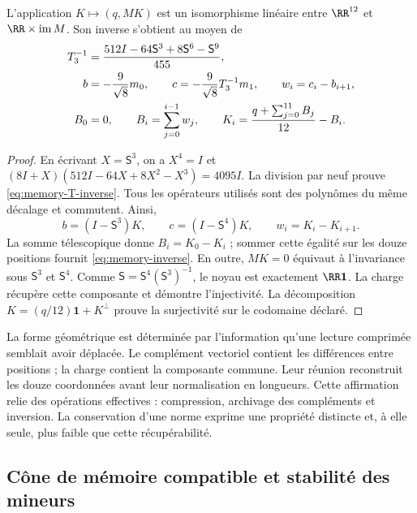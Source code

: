 \begin{theorem}
\label{thm:memory-inversion}
L'application \(K\mapsto(q,MK)\) est un isomorphisme linéaire entre \(\RR^{12}\) et \(\RR\times\operatorname{im}M\). Son inverse s'obtient au moyen de
\begin{align}
 T_3^{-1}&=\frac{512I-64\mathsf S^3+8\mathsf S^6-\mathsf S^9}{455},
 \label{eq:memory-T-inverse}\\
 b&=-\frac9{\sqrt8}m_0,\qquad
 c=-\frac9{\sqrt8}T_3^{-1}m_1,\qquad w_i=c_i-b_{i+1},\notag\\
 B_0&=0,\qquad B_i=\sum_{j=0}^{i-1}w_j,\qquad
 K_i=\frac{q+\sum_{j=0}^{11}B_j}{12}-B_i.
 \label{eq:memory-inverse}
\end{align}
\end{theorem}
\begin{proof}
En écrivant \(X=\mathsf S^3\), on a \(X^4=I\) et
\((8I+X)(512I-64X+8X^2-X^3)=4095I\). La division par neuf
prouve \eqref{eq:memory-T-inverse}. Tous les opérateurs utilisés sont des
polynômes du même décalage et commutent. Ainsi,
\[
 b=(I-\mathsf S^3)K,\qquad c=(I-\mathsf S^4)K,
 \qquad w_i=K_i-K_{i+1}.
\]
La somme télescopique donne \(B_i=K_0-K_i\) ; sommer cette égalité sur
les douze positions fournit \eqref{eq:memory-inverse}. En outre,
\(MK=0\) équivaut à l’invariance sous \(\mathsf S^3\) et
\(\mathsf S^4\). Comme \(\mathsf S=\mathsf S^4(\mathsf S^3)^{-1}\),
le noyau est exactement \(\RR\mathbf1\). La charge récupère cette
composante et démontre l’injectivité. La décomposition
\(K=(q/12)\mathbf1+K^\perp\) prouve la surjectivité sur le
codomaine déclaré.
\end{proof}

La forme géométrique est déterminée par l'information qu'une lecture comprimée semblait avoir déplacée. Le complément vectoriel contient les différences entre positions ; la charge contient la composante commune. Leur réunion reconstruit les douze coordonnées avant leur normalisation en longueurs. Cette affirmation relie des opérations effectives : compression, archivage des compléments et inversion. La conservation d'une norme exprime une propriété distincte et, à elle seule, plus faible que cette récupérabilité.

\subsection{Cône de mémoire compatible et stabilité des mineurs}

